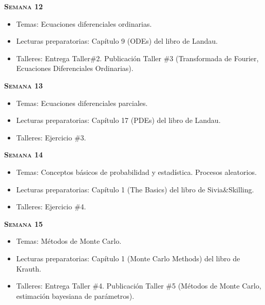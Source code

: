 \documentclass[letterpaper,10pt,onecolumn]{article}
\begin{document}
\noindent\textbf{\textsc{Semana 12}}\\[-0.5cm]
\begin{itemize}
\item Temas: Ecuaciones diferenciales ordinarias. \\[-0.6cm]
\item Lecturas preparatorias: Cap\'itulo 9 (ODEs) del libro de
  Landau. \\[-0.6cm] 
\item Talleres: Entrega Taller\#2. Publicaci\'on Taller \#3
  (Transformada de Fourier, Ecuaciones Diferenciales Ordinarias). \\[-0.6cm]
\end{itemize}

\noindent\textbf{\textsc{Semana 13}}\\[-0.5cm]
\begin{itemize}
\item Temas: Ecuaciones diferenciales parciales. \\[-0.6cm]
\item Lecturas preparatorias: Cap\'itulo 17 (PDEs) del libro de
  Landau. \\[-0.6cm] 
\item Talleres: Ejercicio \#3. \\[-0.6cm]
\end{itemize}

\noindent\textbf{\textsc{Semana 14}}\\[-0.5cm]
\begin{itemize}
\item Temas: Conceptos b\'asicos de
  probabilidad y estad\'istica. Procesos aleatorios. \\[-0.6cm]  
\item Lecturas preparatorias: Cap\'itulo 1 (The Basics) del libro de
  Sivia\&Skilling. \\[-0.6cm]
\item Talleres: Ejercicio \#4.\\[-0.6cm]
\end{itemize}

\noindent\textbf{\textsc{Semana 15}}\\[-0.5cm]
\begin{itemize}
\item Temas: M\'etodos de Monte Carlo. \\[-0.6cm]
\item Lecturas preparatorias: Cap\'itulo 1 (Monte Carlo Methods) del
  libro de Krauth.\\[-0.6cm]
\item Talleres: Entrega Taller \#4. Publicaci\'on Taller \#5
  (M\'etodos de Monte Carlo, estimaci\'on bayesiana de par\'ametros). \\[-0.6cm]
\end{itemize}
\end{document}
